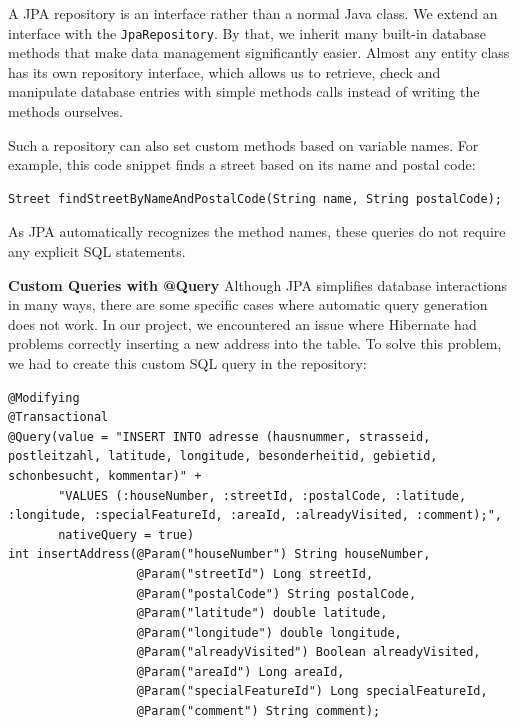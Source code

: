     A JPA repository is an interface rather than a normal Java class. We extend an interface with the \texttt{JpaRepository}. By that, we inherit many built-in database methods that make data management significantly easier. Almost any entity class has its own repository interface, which allows us to retrieve, check and manipulate database entries with simple methods calls instead of writing the methods ourselves. \newline

    Such a repository can also set custom methods based on variable names. For example, this code snippet finds a street based on its name and postal code:
    \lstset{style=mycsharp, caption=Find Street By Name And Postal Code}
    \begin{lstlisting}
Street findStreetByNameAndPostalCode(String name, String postalCode);          
    \end{lstlisting} 
    As JPA automatically recognizes the method names, these queries do not require any explicit SQL statements.

    \textbf{Custom Queries with @Query} \newline
    Although JPA simplifies database interactions in many ways, there are some specific cases where automatic query generation does not work. In our project, we encountered an issue where Hibernate had problems correctly inserting a new address into the table. To solve this problem, we had to create this custom SQL query in the repository:
    \lstset{style=mycsharp, caption=Insert Address with Custom Query}
    \begin{lstlisting}
@Modifying
@Transactional
@Query(value = "INSERT INTO adresse (hausnummer, strasseid, postleitzahl, latitude, longitude, besonderheitid, gebietid, schonbesucht, kommentar)" +
       "VALUES (:houseNumber, :streetId, :postalCode, :latitude, :longitude, :specialFeatureId, :areaId, :alreadyVisited, :comment);",
       nativeQuery = true)
int insertAddress(@Param("houseNumber") String houseNumber,
                  @Param("streetId") Long streetId,
                  @Param("postalCode") String postalCode,
                  @Param("latitude") double latitude,
                  @Param("longitude") double longitude,
                  @Param("alreadyVisited") Boolean alreadyVisited,
                  @Param("areaId") Long areaId,
                  @Param("specialFeatureId") Long specialFeatureId,
                  @Param("comment") String comment);          
    \end{lstlisting} 

